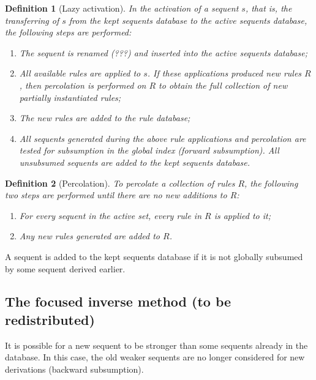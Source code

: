 \documentclass{article}
\newtheorem{definition}{Definition}
\begin{document}
\begin{definition}[Lazy activation]
  In the activation of a sequent $s$, that is, the transferring of $s$ from the
  kept sequents database to the active sequents database, the following steps
  are performed:

  \begin{enumerate}
  \item The sequent is renamed (???) and inserted into the active sequents
    database;
  \item All available rules are applied to $s$. If these applications produced
    new rules $R$, then percolation is performed on $R$ to obtain the full
    collection of new partially instantiated rules;
  \item The new rules are added to the rule database;
  \item All sequents generated during the above rule applications and
    percolation are tested for subsumption in the global index (forward
    subsumption). All unsubsumed sequents are added to the kept sequents
    database.
  \end{enumerate}
\end{definition}

\begin{definition}[Percolation]
  To percolate a collection of rules $R$, the following two steps are performed
  until there are no new additions to $R$:

  \begin{enumerate}
  \item For every sequent in the active set, every rule in $R$ is applied to it;
  \item Any new rules generated are added to $R$.
  \end{enumerate}
\end{definition}

A sequent is added to the kept sequents database if it is not globally subsumed
by some sequent derived earlier.

\subsection{The focused inverse method (to be redistributed)}


It is possible for a new sequent to be stronger than some sequents already in
the database. In this case, the old weaker sequents are no longer considered for
new derivations (backward subsumption).
\end{document}
